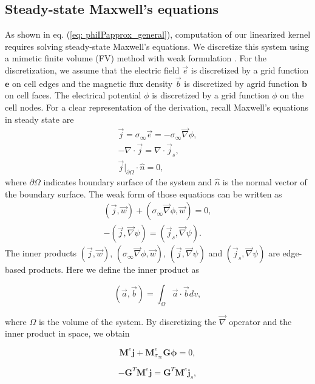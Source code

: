 \documentclass[extra,mreferee]{gji}
\renewcommand{\div}{\nabla\cdot}
\newcommand{\grad}{\vec \nabla}
\newcommand{\siginf}{\sigma_\infty}
\newcommand{\dgrad}{{\mathbf G}}
\newcommand{\M}{{\mathbf M}}
\newcommand{\MeSigInf}{{\M^e_{\sigma_\infty}}}
\newcommand{\Me}{{\M^e}}
\renewcommand {\j}  { {\vec j} }
\renewcommand {\b}  { {\vec b} }
\newcommand {\e}  { {\vec e} }
\renewcommand {\dj}  { {\mathbf{j} } }
\newcommand {\db}  { {\mathbf{b} } }
\newcommand {\de}  { {\mathbf{e} } }
\begin{document}
\subsection{Steady-state Maxwell's equations}
\label{section:maxwell_discrete}
As shown in eq. (\ref{eq: phiIPapprox_general}), computation of our linearized kernel requires solving steady-state Maxwell's equations.
We discretize this system using a mimetic finite volume (FV) method with weak formulation \cite[]{Yee1966,Eldadbook}.
For the discretization, we assume that the electric field $\e$ is discretized by a grid function $\de$ on cell edges and the magnetic flux density $\b$ is discretized by agrid function $\db$ on cell faces.
The electrical potential $\phi$ is discretized by a grid function  $\phi$ on the cell nodes. For a clear representation of the derivation, recall Maxwell's equations in steady state are
\begin{align}
  \j = \siginf\e = -\siginf\grad \phi, \\
  -\div \j = \div \j_s, \\
  \j\big|_{\partial \Omega}\cdot\hat{n} = 0,
  \label{eq:DCBCneumann}
\end{align}
where $\partial \Omega$ indicates boundary surface of the system and $\hat{n}$ is the normal vector of the boundary surface. The weak form of those equations  can be written as
\begin{align}
  (\j, \vec{w}) + (\siginf \grad \phi, \vec{w}) = 0, \\
  -(\j, \grad \psi) = (\j_s, \grad \psi).
\end{align}
The inner products $(\j, \vec{w})$, $(\siginf \grad \phi, \vec{w})$,  $(\j, \grad \psi)$ and $(\j_s, \grad \psi)$ are edge-based products. Here we define the inner product as
\begin{linenomath*}
\begin{equation}
  (\vec{a}, \vec{b}) = \int_{\Omega} \vec{a}\cdot\vec{b} dv,
\end{equation}
\end{linenomath*}
where $\Omega$ is the volume of the system. By discretizing the $\grad$ operator and the inner product in space, we obtain
\begin{linenomath*}
\begin{equation}
  \Me\dj + \MeSigInf\dgrad\boldsymbol{\phi} = 0,
  \label{eq:DCdisceq1}
\end{equation}
\end{linenomath*}
\begin{linenomath*}
\begin{equation}
  -\dgrad^T \Me\dj = \dgrad^T \Me\dj_s,
  \label{eq:DCdisceq2}
\end{equation}
\end{linenomath*}
\end{document}
